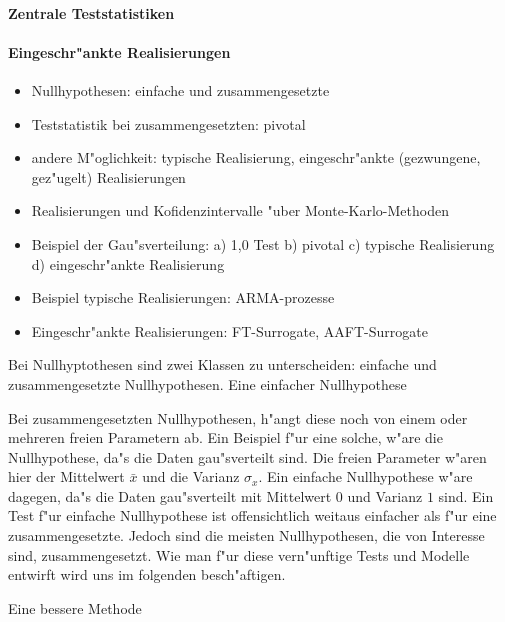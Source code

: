 \paragraph{Zentrale Teststatistiken}




\paragraph{Eingeschr"ankte Realisierungen}



\begin{itemize}
\item Nullhypothesen: einfache und zusammengesetzte
\item Teststatistik bei zusammengesetzten: pivotal
\item andere M"oglichkeit: typische Realisierung, eingeschr"ankte (gezwungene, gez"ugelt) Realisierungen 
\item Realisierungen und Kofidenzintervalle "uber Monte-Karlo-Methoden
\item Beispiel der Gau"sverteilung: a) 1,0 Test b) pivotal c) typische Realisierung d) eingeschr"ankte Realisierung
\item Beispiel typische Realisierungen: ARMA-prozesse
\item Eingeschr"ankte Realisierungen: FT-Surrogate, AAFT-Surrogate
\end{itemize}


Bei Nullhyptothesen sind zwei Klassen zu unterscheiden: einfache und zusammengesetzte
Nullhypothesen.  Eine einfacher Nullhypothese

Bei zusammengesetzten Nullhypothesen, h"angt diese noch von einem oder mehreren freien
Parametern ab. Ein Beispiel f"ur eine solche, w"are die Nullhypothese, da"s die Daten
gau"sverteilt sind. Die freien Parameter w"aren hier der Mittelwert $\bar x$ und die
Varianz $\sigma_x$. Ein einfache Nullhypothese w"are dagegen, da"s die Daten gau"sverteilt
mit Mittelwert $0$ und Varianz $1$ sind. Ein Test f"ur einfache Nullhypothese ist
offensichtlich weitaus einfacher als f"ur eine zusammengesetzte. Jedoch sind die meisten
Nullhypothesen, die von Interesse sind, zusammengesetzt. Wie man f"ur diese vern"unftige
Tests und Modelle entwirft wird uns im folgenden besch"aftigen.






Eine bessere Methode \cite{prichard-theiler3}


